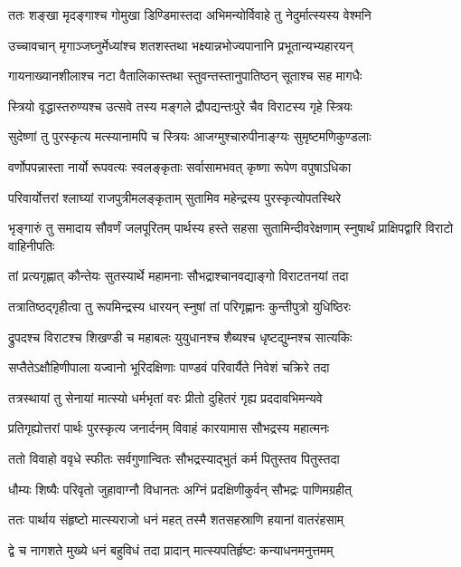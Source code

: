 \twolineshloka
{ततः शङ्खा मृदङ्गाश्च गोमुखा डिण्डिमास्तदा}
{अभिमन्योर्विवाहे तु नेदुर्मात्स्यस्य वेश्मनि}


\twolineshloka
{उच्चावचान् मृगाञ्जघ्नुर्मेध्यांश्च शतशस्तथा}
{भक्ष्यान्नभोज्यपानानि प्रभूतान्यभ्यहारयन्}


\twolineshloka
{गायनाख्यानशीलाश्च नटा वैतालिकास्तथा}
{स्तुवन्तस्तानुपातिष्ठन् सूताश्च सह मागधैः}


\twolineshloka
{स्त्रियो वृद्धास्तरुण्यश्च उत्सवे तस्य मङ्गले}
{द्रौपद्यन्तःपुरे चैव विराटस्य गृहे स्त्रियः}


\twolineshloka
{सुदेष्णां तु पुरस्कृत्य मत्स्यानामपि च स्त्रियः}
{आजग्मुश्चारुपीनाङ्ग्यः सुमृष्टमणिकुण्डलाः}


\twolineshloka
{वर्णोपपन्नास्ता नार्यो रूपवत्यः स्वलङ्कृताः}
{सर्वासामभवत् कृष्णा रूपेण वपुषाऽधिका}


\twolineshloka
{परिवार्योत्तरां श्लाघ्यां राजपुत्रीमलङ्कृताम्}
{सुतामिव महेन्द्रस्य पुरस्कृत्योपतस्थिरे}


\threelineshloka
{भृङ्गारुं तु समादाय सौवर्णं जलपूरितम्}
{पार्थस्य हस्ते सहसा सुतामिन्दीवरेक्षणाम्}
{स्नुषार्थं प्राक्षिपद्वारि विराटो वाहिनीपतिः}


\twolineshloka
{तां प्रत्यगृह्णात् कौन्तेयः सुतस्यार्थे महामनाः}
{सौभद्राश्चानवद्याङ्गो विराटतनयां तदा}


\twolineshloka
{तत्रातिष्ठद्गृहीत्वा तु रूपमिन्द्रस्य धारयन्}
{स्नुषां तां परिगृह्णानः कुन्तीपुत्रो युधिष्ठिरः}


\twolineshloka
{द्रुपदश्च विराटश्च शिखण्डी च महाबलः}
{युयुधानश्च शैब्यश्च धृष्टद्युम्नश्च सात्यकिः}


\twolineshloka
{सप्तैतेऽक्षौहिणीपाला यज्वानो भूरिदक्षिणाः}
{पाण्डवं परिवार्यैते निवेशं चक्रिरे तदा}


\twolineshloka
{तत्रस्थायां तु सेनायां मात्स्यो धर्मभृतां वरः}
{प्रीतो दुहितरं गृह्य प्रददावभिमन्यवे}


\twolineshloka
{प्रतिगृह्योत्तरां पार्थः पुरस्कृत्य जनार्दनम्}
{विवाहं कारयामास सौभद्रस्य महात्मनः}


\twolineshloka
{ततो विवाहो ववृधे स्फीतः सर्वगुणान्वितः}
{सौभद्रस्याद्भुतं कर्म पितुस्तव पितुस्तदा}


\twolineshloka
{धौम्यः शिष्यैः परिवृतो जुहावाग्नौ विधानतः}
{अग्निं प्रदक्षिणीकुर्वन् सौभद्रः पाणिमग्रहीत्}


\twolineshloka
{ततः पार्थाय संहृष्टो मात्स्यराजो धनं महत्}
{तस्मै शतसहस्राणि हयानां वातरंहसाम्}


\twolineshloka
{द्वे च नागशते मुख्ये धनं बहुविधं तदा}
{प्रादान् मात्स्यपतिर्हृष्टः कन्याधनमनुत्तमम्}


